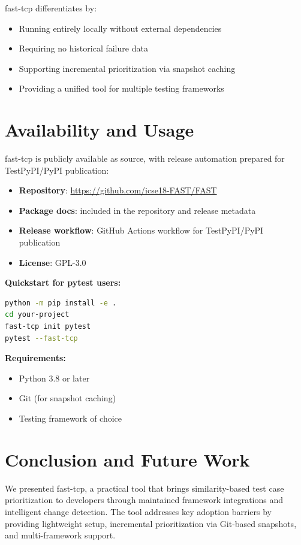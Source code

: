 \documentclass[10pt,conference]{IEEEtran}
\begin{document}
fast-tcp differentiates by:
\begin{itemize}
    \item Running entirely locally without external dependencies
    \item Requiring no historical failure data
    \item Supporting incremental prioritization via snapshot caching
    \item Providing a unified tool for multiple testing frameworks
\end{itemize}

\section{Availability and Usage}

fast-tcp is publicly available as source, with release automation prepared for TestPyPI/PyPI publication:

\begin{itemize}
    \item \textbf{Repository}: \url{https://github.com/icse18-FAST/FAST}
    \item \textbf{Package docs}: included in the repository and release metadata
    \item \textbf{Release workflow}: GitHub Actions workflow for TestPyPI/PyPI publication
    \item \textbf{License}: GPL-3.0
\end{itemize}

\noindent\textbf{Quickstart for pytest users:}
\begin{lstlisting}[language=bash,numbers=none]
python -m pip install -e .
cd your-project
fast-tcp init pytest
pytest --fast-tcp
\end{lstlisting}

\noindent\textbf{Requirements:}
\begin{itemize}
    \item Python 3.8 or later
    \item Git (for snapshot caching)
    \item Testing framework of choice
\end{itemize}

\section{Conclusion and Future Work}

We presented fast-tcp, a practical tool that brings similarity-based test case prioritization to developers through maintained framework integrations and intelligent change detection. The tool addresses key adoption barriers by providing lightweight setup, incremental prioritization via Git-based snapshots, and multi-framework support.
\end{document}
